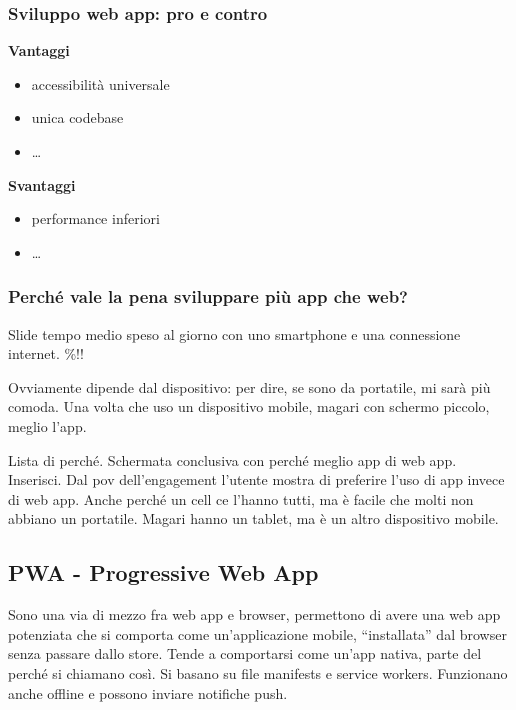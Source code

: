 \subsubsection{Sviluppo web app: pro e contro}
\par \textbf{Vantaggi}
\begin{itemize}
    \item accessibilità universale
    \item unica codebase
    \item \dots
\end{itemize}
\par \textbf{Svantaggi}
\begin{itemize}
    \item performance inferiori 
    \item \dots
\end{itemize}

\subsubsection{Perché vale la pena sviluppare più app che web?}
\par Slide tempo medio speso al giorno con uno smartphone e una connessione internet. \%!!
\par Ovviamente dipende dal dispositivo: per dire, se sono da portatile, mi sarà più comoda. Una volta che uso un dispositivo mobile, magari con schermo piccolo, meglio l'app.
\par Lista di perché.
Schermata conclusiva con perché meglio app di web app. Inserisci. Dal pov dell'engagement l'utente mostra di preferire l'uso di app invece di web app. Anche perché un cell ce l'hanno tutti, ma è facile che molti non abbiano un portatile. Magari hanno un tablet, ma è un altro dispositivo mobile.

\subsection{PWA - Progressive Web App}
\par Sono una via di mezzo fra web app e browser, permettono di avere una web app potenziata che si comporta come un'applicazione mobile, ``installata'' dal browser senza passare dallo store. Tende a comportarsi come un'app nativa, parte del perché si chiamano così. Si basano su file manifests e service workers. Funzionano anche offline e possono inviare notifiche push.

